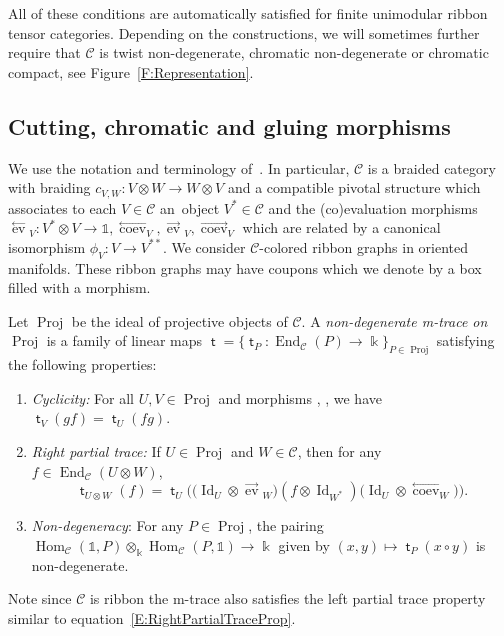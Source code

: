 \documentclass[10pt,a4paper]{amsart}
\numberwithin{equation}{section}
\newcommand{\Proj}{\operatorname{Proj}}
\newcommand{\tto}{\xrightarrow}
\numberwithin{theorem}{section}
\numberwithin{proposition}{section}
\numberwithin{definition}{section}
\numberwithin{lemma}{section}
\numberwithin{corollary}{section}
\numberwithin{remark}{section}
\numberwithin{example}{section}
\newcommand{\rcoev}{\stackrel{\longrightarrow}{\operatorname{coev}}}
\newcommand{\rev}{\stackrel{\longrightarrow}{\operatorname{ev}}\!\!}
\newcommand{\lev}{\stackrel{\longleftarrow}{\operatorname{ev}}\!\!}
\newcommand{\lcoev}{\stackrel{\longleftarrow}{\operatorname{coev}}}
\newcommand{\bp}[1]{{\left(#1\right)}}
\newcommand{\cat}{\mathcal{C}}
\newcommand{\End}{\operatorname{End}}
\newcommand{\Hom}{\operatorname{Hom}}
\newcommand{\unit}{\ensuremath{\mathds{1}}}
\newcommand{\Id}{\operatorname{Id}}
\newcommand{\FK}{{\Bbbk}}
\newcommand{\mt}{{\operatorname{\mathsf{t}}}}
\newcommand{\qt}{\operatorname{\mathsf{t}}}
\begin{document}
All of these conditions are automatically satisfied for finite unimodular ribbon tensor categories. Depending on the constructions, we will sometimes further require that $\cat$ is twist non-degenerate, chromatic non-degenerate or chromatic compact, see Figure~\ref{F:Representation}.

 \subsection{Cutting, chromatic and gluing morphisms}\label{SS:Def-gluingmorph}
 We use the notation and terminology of~\cite{CGP22}. In particular,
$\cat$ is a braided category with braiding
$c_{V,W}\colon V\otimes W\to W\otimes V$ and a compatible pivotal structure
which associates to each $V \in \cat$ an~object $V^*\in \cat$ and the
(co)evaluation morphisms $\lev_V\colon V^*\otimes V \to \unit, \lcoev_V, \rev_V,\rcoev_V$ which are
related by a canonical isomorphism $\phi_V\colon V\to V^{**}$. We consider
$\cat$-colored ribbon graphs in oriented manifolds. These ribbon
graphs may have coupons which we denote by a box filled with a morphism.

\begin{definition}
 Let $\Proj$ be the ideal of projective objects of $\cat$. A
\emph{non-degenerate m-trace on $\Proj$} is a family of linear maps
$\mt=\{\mt_P\colon\End_\cat(P)\to\FK\}_{P\in\Proj}$ satisfying the
following properties:
\begin{enumerate}\itemsep=0pt
\item \textit{Cyclicity:} For all $U,V\in \Proj$ and morphisms
 \smash{$ V\tto f U$}, \smash{$U\tto g V$}, we have $ \qt_V(g f)=\qt_U(f g)$.
\item \textit{Right partial trace:} %
 If
 $U\in \Proj$ and $W\in \cat$, then for any
 $f\in \End_\cat(U\otimes W)$,
\begin{equation}\label{E:RightPartialTraceProp}
 \qt_{U\otimes W}\bp{f}
 =\qt_U\bigl(\bigl(\Id_U \otimes \rev_W\bigr)(f\otimes \Id_{W^*})\bigl(\Id_U \otimes \lcoev_W\bigr)\bigr).
\end{equation}
\item \textit{Non-degeneracy}: For any $P\in\Proj$, the pairing
 $\Hom_\cat(\unit,P)\otimes_\FK\Hom_\cat(P,\unit)\to\FK$ given by
 $(x,y)\mapsto\mt_P(x\circ y)$ is non-degenerate.
\end{enumerate}
Note since $\cat$ is ribbon the m-trace also satisfies the left
partial trace property similar to equation~\eqref{E:RightPartialTraceProp}.
\end{definition}
\end{document}
